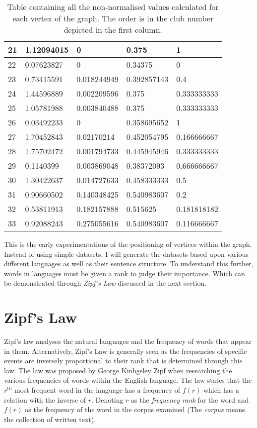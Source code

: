 \begin{table}[!htb]
\begin{tabular}{|l|l|l|l|l|}
        21 & 1.12094015 & 0 & 0.375 & 1 \\ \hline
        22 & 0.07623827 & 0 & 0.34375 & 0 \\ \hline
        23 & 0.73415591 & 0.018244949 & 0.392857143 & 0.4 \\ \hline
        24 & 1.44596889 & 0.002209596 & 0.375 & 0.333333333 \\ \hline
        25 & 1.05781988 & 0.003840488 & 0.375 & 0.333333333 \\ \hline
        26 & 0.03492233 & 0 & 0.358695652 & 1 \\ \hline
        27 & 1.70452843 & 0.02170214 & 0.452054795 & 0.166666667 \\ \hline
        28 & 1.75702472 & 0.001794733 & 0.445945946 & 0.333333333 \\ \hline
        29 & 0.1140399 & 0.003869048 & 0.38372093 & 0.666666667 \\ \hline
        30 & 1.30422637 & 0.014727633 & 0.458333333 & 0.5 \\ \hline
        31 & 0.90660502 & 0.140348425 & 0.540983607 & 0.2 \\ \hline
        32 & 0.53811913 & 0.182157888 & 0.515625 & 0.181818182 \\ \hline
        33 & 0.92088243 & 0.275055616 & 0.540983607 & 0.116666667 \\ \hline
    \end{tabular}
	\caption{Table containing all the non-normalised values calculated for each vertex of the graph. The order is in the club number depicted in the first column.}
    \label{KarateTable}
\end{table}

This is the early experimentations of the positioning of vertices within the graph. Instead of using simple datasets, I will generate the datasets based upon various different languages as well as their sentence structure. To understand this further, words in languages must be given a rank to judge their importance. Which can be demonstrated through \emph{Zipf's Law} discussed in the next section.

\section{Zipf's Law}
Zipf's law analyses the natural languages and the frequency of words that appear in them. Alternatively, Zipf's Law \cite{hosch2009zipf} is generally seen as the frequencies of specific events are inversely proportional to their rank that is determined through this law. The law was proposed by George Kinbgsley Zipf when researching the various frequencies of words within the English language. The law states that the $r^{\text{th}}$ most frequent word in the language has a frequency of $f(r)$ which has a relation with the inverse of $r$. Denoting $r$ as the \emph{frequency rank} for the word and $f(r)$ as the frequency of the word in the corpus examined (The \emph{corpus} means the collection of written text).


